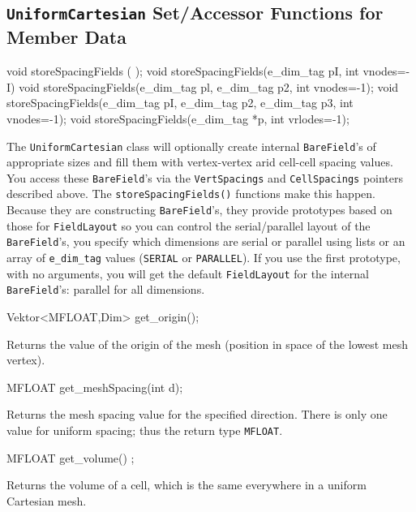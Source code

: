 \subsection{\texttt{UniformCartesian} Set/Accessor Functions for Member Data} 

\begin{smallcode}
void storeSpacingFields ( );
void storeSpacingFields(e_dim_tag pI, int vnodes=-I) 
void storeSpacingFields(e_dim_tag pl, e_dim_tag p2, int vnodes=-1); 
void storeSpacingFields(e_dim_tag pI, e_dim_tag p2, e_dim_tag p3, int vnodes=-1); 
void storeSpacingFields(e_dim_tag *p, int vrlodes=-1);
\end{smallcode}
The \texttt{UniformCartesian} class will optionally create internal \texttt{BareField}'s of appropriate sizes and fill them with vertex-vertex arid cell-cell spacing values. 
You access these \texttt{BareField}'s via the \texttt{VertSpacings} and \texttt{CellSpacings} pointers described above. 
The \texttt{storeSpacingFields()} functions make this happen. Because they are constructing \texttt{BareField}'s, they provide prototypes based on those for \texttt{FieldLayout} 
so you can control the serial/parallel layout of the \texttt{BareField}'s, you specify which dimensions are serial or parallel using lists or an array of \texttt{e\_dim\_tag} 
values (\texttt{SERIAL} or \texttt{PARALLEL}). If you use the first prototype, with no arguments, you will get the default \texttt{FieldLayout} for the internal \texttt{BareField}'s: 
parallel for all dimensions.

\begin{smallcode}
Vektor<MFLOAT,Dim> get_origin();
\end{smallcode}
Returns the value of the origin of the mesh (position in space of the lowest mesh vertex). 

\begin{smallcode}
MFLOAT get_meshSpacing(int d);
\end{smallcode}
Returns the mesh spacing value for the specified direction. There is only one value for uniform spacing; thus the return type \texttt{MFLOAT}. 
\begin{smallcode}
MFLOAT get_volume() ;
\end{smallcode}
Returns the volume of a cell, which is the same everywhere in a uniform Cartesian mesh. 


